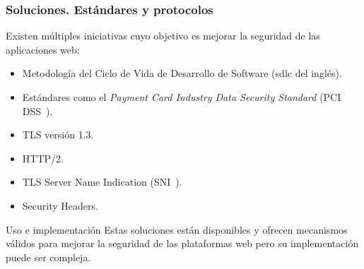 \begin{frame}[shrink=20]
  \frametitle{Soluciones. Estándares y protocolos}
  Existen múltiples iniciativas cuyo objetivo es mejorar la seguridad de las aplicaciones web:
  \begin{itemize}
    \item Metodología del Ciclo de Vida de Desarrollo de Software (\acrshort{sdlc} del inglés).
    \item Estándares como el {\em Payment Card Industry Data Security Standard} (PCI DSS~\cite{pcidssrequirements}).
    \item TLS versión 1.3.
    \item HTTP/2.
    \item TLS Server Name Indication (SNI~\cite{wiki:TLSSNI}).
    \item Security Headers.
  \end{itemize}
  \begin{block}{Uso e implementación}
    Estas soluciones están disponibles y ofrecen mecanismos válidos para mejorar la seguridad de las plataformas web pero su implementación puede ser compleja.
  \end{block}
\end{frame}

